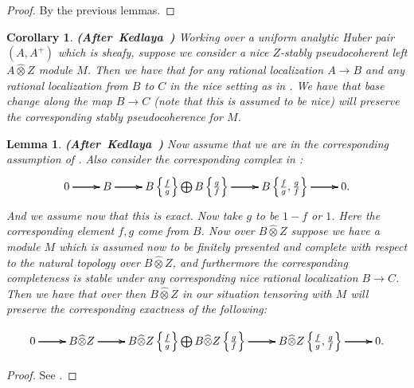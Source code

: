 \documentclass[12pt]{amsart}
\newtheorem{lemma}[theorem]{Lemma}
\newtheorem{corollary}[theorem]{Corollary}
\theoremstyle{definition}
\numberwithin{equation}{section}
\begin{document}
\begin{proof}
By the previous lemmas.	
\end{proof}


\begin{corollary}\mbox{\bf{(After Kedlaya \cite[Corollary 1.9.6]{Ked2})}}
Working over a uniform analytic Huber pair $(A,A^+)$ which is sheafy, suppose we consider a nice $Z$-stably pseudocoherent left $A\widehat{\otimes}Z$ module $M$. Then we have that for any rational localization $A\rightarrow B$ and any rational localization from $B$ to $C$ in the nice setting as in \cite[Definition 1.9.1]{Ked2}. We have that base change along the map $B\rightarrow C$ (note that this is assumed to be nice) will preserve the corresponding stably pseudocoherence for $M$.

\end{corollary}


\begin{lemma} \mbox{\bf{(After Kedlaya \cite[Lemma 1.9.7]{Ked2})}}
Now assume that we are in the corresponding assumption of \cite[1.7.1]{Ked2}. Also consider the corresponding complex in \cite[1.6.15.1]{Ked2}:
\[
\xymatrix@C+0pc@R+0pc{
0 \ar[r] \ar[r] \ar[r] &B \ar[r] \ar[r] \ar[r] &B\left\{\frac{f}{g}\right\}\bigoplus B\left\{\frac{g}{f}\right\} \ar[r] \ar[r] \ar[r] &B\left\{\frac{f}{g},\frac{g}{f}\right\} \ar[r] \ar[r] \ar[r] &0.
}
\]	
And we assume now that this is exact. Now take $g$ to be $1-f$ or $1$. Here the corresponding element $f,g$ come from $B$. Now over $B\widehat{\otimes}Z$ suppose we have a module $M$ which is assumed now to be finitely presented and complete with respect to the natural topology over $B\widehat{\otimes}Z$, and furthermore the corresponding completeness is stable under any corresponding nice rational localization $B\rightarrow C$. Then we have that over then $B\widehat{\otimes}Z$ in our situation tensoring with $M$ will preserve the corresponding exactness of the following:

\[
\xymatrix@C+0pc@R+0pc{
0 \ar[r] \ar[r] \ar[r] &B\widehat{\otimes}Z \ar[r] \ar[r] \ar[r] &B\widehat{\otimes}Z \left\{\frac{f}{g}\right\}\bigoplus B\widehat{\otimes}Z \left\{\frac{g}{f}\right\} \ar[r] \ar[r] \ar[r] &B\widehat{\otimes}Z \left\{\frac{f}{g},\frac{g}{f}\right\} \ar[r] \ar[r] \ar[r] &0.
}
\]	



	
\end{lemma}





\begin{proof}
See \cite[Lemma 1.9.7]{Ked2}.	
\end{proof}
\end{document}
